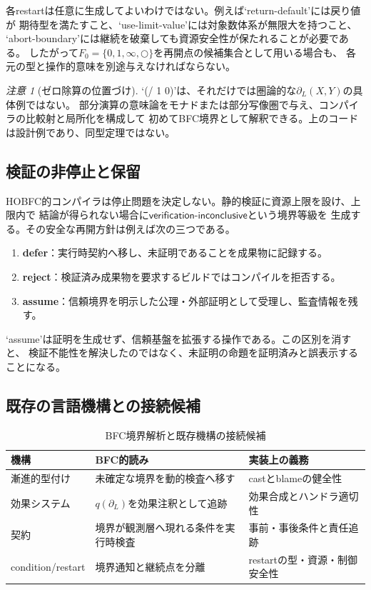 \documentclass[11pt,a4paper]{ltjsarticle}
\theoremstyle{definition}
\theoremstyle{remark}
\newtheorem{remark}[definition]{注意}
\newcommand{\Boundary}{\partial_L}
\begin{document}
各restartは任意に生成してよいわけではない。例えば`return-default'には戻り値が
期待型を満たすこと、`use-limit-value'には対象数体系が無限大を持つこと、
`abort-boundary'には継続を破棄しても資源安全性が保たれることが必要である。
したがって$F_0=\{0,1,\infty,\bigcirc\}$を再開点の候補集合として用いる場合も、
各元の型と操作的意味を別途与えなければならない。

\begin{remark}[ゼロ除算の位置づけ]
`(/ 1 0)'は、それだけでは圏論的な$\Boundary(X,Y)$の具体例ではない。
部分演算の意味論をモナドまたは部分写像圏で与え、コンパイラの比較射と局所化を構成して
初めてBFC境界として解釈できる。上のコードは設計例であり、同型定理ではない。
\end{remark}

\subsection{検証の非停止と保留}

HOBFC的コンパイラは停止問題を決定しない。静的検証に資源上限を設け、上限内で
結論が得られない場合に$\mathsf{verification\mbox{-}inconclusive}$という境界等級を
生成する。その安全な再開方針は例えば次の三つである。

\begin{enumerate}
 \item \textbf{defer}：実行時契約へ移し、未証明であることを成果物に記録する。
 \item \textbf{reject}：検証済み成果物を要求するビルドではコンパイルを拒否する。
 \item \textbf{assume}：信頼境界を明示した公理・外部証明として受理し、監査情報を残す。
\end{enumerate}

`assume'は証明を生成せず、信頼基盤を拡張する操作である。この区別を消すと、
検証不能性を解決したのではなく、未証明の命題を証明済みと誤表示することになる。

\subsection{既存の言語機構との接続候補}

\begin{table}[htbp]
\centering
\caption{BFC境界解析と既存機構の接続候補}
\small
\begin{tabularx}{\textwidth}{@{}l >{\raggedright\arraybackslash}X >{\raggedright\arraybackslash}X@{}}
\toprule
機構 & BFC的読み & 実装上の義務 \\
\midrule
漸進的型付け & 未確定な境界を動的検査へ移す & castとblameの健全性 \\
効果システム & $q(\Boundary)$を効果注釈として追跡 & 効果合成とハンドラ適切性 \\
契約 & 境界が観測層へ現れる条件を実行時検査 & 事前・事後条件と責任追跡 \\
condition/restart & 境界通知と継続点を分離 & restartの型・資源・制御安全性 \\
\bottomrule
\end{tabularx}
\end{table}
\end{document}
